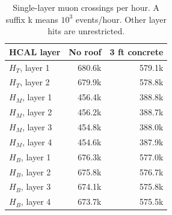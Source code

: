 \begin{table}[htbp]
\centering\small
\caption{Single-layer muon crossings per hour. A suffix k means $10^3$ events/hour. Other layer hits are unrestricted.}\label{tab:singles}
\begin{tabular}{lrr}
\toprule
HCAL layer & No roof & 3 ft concrete\\
\midrule
$H_T$, layer 1 & 680.6k & 579.1k\\
$H_T$, layer 2 & 679.9k & 578.8k\\
$H_M$, layer 1 & 456.4k & 388.8k\\
$H_M$, layer 2 & 456.2k & 388.7k\\
$H_M$, layer 3 & 454.8k & 388.0k\\
$H_M$, layer 4 & 454.6k & 387.9k\\
$H_B$, layer 1 & 676.3k & 577.0k\\
$H_B$, layer 2 & 675.8k & 576.7k\\
$H_B$, layer 3 & 674.1k & 575.8k\\
$H_B$, layer 4 & 673.7k & 575.5k\\
\bottomrule
\end{tabular}
\end{table}

